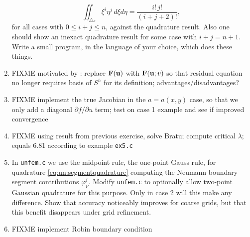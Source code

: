 \begin{enumerate}
\begin{equation}
\iint_{\triangle_\ast} \xi^i \eta^j\,d\xi d\eta = \frac{i!\,j!}{(i+j+2)!}, \label{eq:un:checkquadrature}
\end{equation}
for all cases with $0\le i+j\le n$, against the quadrature result.  Also one should show an inexact quadrature result for some case with $i+j=n+1$.  Write a small program, in the language of your choice, which does these things.
\item \label{exer:un:basisfreeresidual} FIXME motivated by \citep{Loggetal2012}: replace $\mathbf{F}(\mathbf{u})$ with $\mathbf{F}(\mathbf{u};v)$ so that residual equation no longer requires basis of $S^h$ for its definition; advantages/disadvantages?
\item \label{exer:un:truejacobian} FIXME implement the true Jacobian in the $a=a(x,y)$ case, so that we only add a diagonal $\partial f/\partial u$ term; test on case 1 example and see if improved \pSNES convergence
\item \label{exer:un:bratu} FIXME using result from previous exercise, solve Bratu; compute critical $\lambda$; equals 6.81 according to \pSNES example \texttt{ex5.c}
\item \label{exer:un:gaussneumann}  In \texttt{unfem.c} we use the midpoint rule, the one-point Gauss rule, for quadrature \eqref{eq:un:segmentquadrature} computing the Neumann boundary segment contributions $\varphi_\nu^i$.  Modify \texttt{unfem.c} to optionally allow two-point Gaussian quadrature for this purpose.  Only in case 2 will this make any difference.  Show that accuracy noticeably improves for coarse grids, but that this benefit disappears under grid refinement.
\item \label{exer:un:robin} FIXME implement Robin boundary condition
\end{enumerate}

